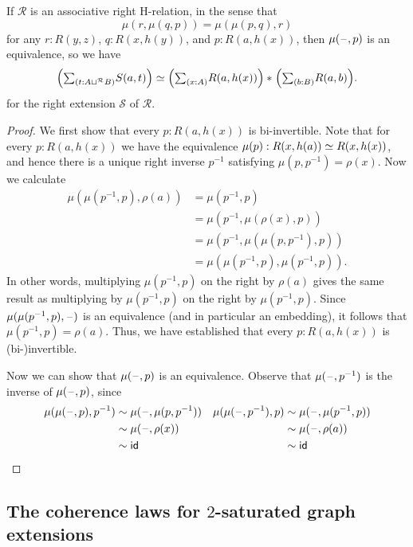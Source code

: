 \begin{cor}
If $\mathcal{R}$ is an associative right H-relation, in the sense that
\begin{equation*}
\mu(r,\mu(q,p))=\mu(\mu(p,q),r)
\end{equation*}
for any $r:R(y,z)$, $q:R(x,h(y))$, and $p:R(a,h(x))$, then $\mu(\mathord{\hspace{1pt}\text{--}\hspace{1pt}},p)$ is an equivalence, so we have
\begin{equation*}
\eqv{\Big(\sm{t:A\sqcup^{\mathcal{R}} B}S(a,t)\Big)}{\join{\Big(\sm{x:A}R(a,h(x))\Big)}{\Big(\sm{b:B}R(a,b)\Big)}}.
\end{equation*}
for the right extension $\mathcal{S}$ of $\mathcal{R}$.
\end{cor}

\begin{proof}
We first show that every $p:R(a,h(x))$ is bi-invertible. Note that for every $p:R(a,h(x))$ we have the equivalence $\mu(p):R(x,h(a))\simeq R(x,h(x))$, and hence there is a unique right inverse $p^{-1}$ satisfying $\mu(p,p^{-1})=\rho(x)$. Now we calculate
\begin{align*}
\mu(\mu(p^{-1},p),\rho(a)) & = \mu(p^{-1},p) \\
& = \mu(p^{-1},\mu(\rho(x),p)) \\
& = \mu(p^{-1},\mu(\mu(p,p^{-1}),p)) \\
& = \mu(\mu(p^{-1},p),\mu(p^{-1},p)).
\end{align*}
In other words, multiplying $\mu(p^{-1},p)$ on the right by $\rho(a)$ gives the same result as multiplying by $\mu(p^{-1},p)$ on the right by $\mu(p^{-1},p)$. Since $\mu(\mu(p^{-1},p),\mathord{\hspace{1pt}\text{--}\hspace{1pt}})$ is an equivalence (and in particular an embedding), it follows that $\mu(p^{-1},p)=\rho(a)$. Thus, we have established that every $p:R(a,h(x))$ is (bi-)invertible. 

Now we can show that $\mu(\mathord{\hspace{1pt}\text{--}\hspace{1pt}},p)$ is an equivalence. Observe that $\mu(\mathord{\hspace{1pt}\text{--}\hspace{1pt}},p^{-1})$ is the inverse of $\mu(\mathord{\hspace{1pt}\text{--}\hspace{1pt}},p)$, since
\begin{align*}
\mu(\mu(\mathord{\hspace{1pt}\text{--}\hspace{1pt}},p),p^{-1}) & \sim \mu(\mathord{\hspace{1pt}\text{--}\hspace{1pt}},\mu(p,p^{-1})) & \mu(\mu(\mathord{\hspace{1pt}\text{--}\hspace{1pt}},p^{-1}),p) & \sim \mu(\mathord{\hspace{1pt}\text{--}\hspace{1pt}},\mu(p^{-1},p)) \\
& \sim \mu(\mathord{\hspace{1pt}\text{--}\hspace{1pt}},\rho(x)) & & \sim \mu(\mathord{\hspace{1pt}\text{--}\hspace{1pt}},\rho(a)) \\
& \sim \mathsf{id}_{} & & \sim \mathsf{id}_{} \qedhere
\end{align*}
\end{proof}

\subsection{The coherence laws for $2$-saturated graph extensions}

